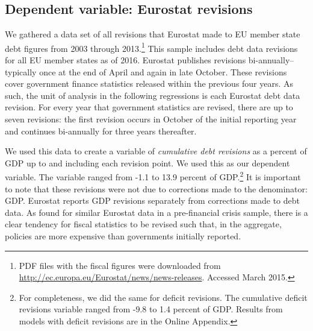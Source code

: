 \documentclass[]{article}
\begin{document}
\subsection{Dependent variable: Eurostat revisions}

We gathered a data set of all revisions that Eurostat made to EU member state debt figures from 2003 through 2013.\footnote{PDF files with the fiscal figures were downloaded from \url{http://ec.europa.eu/Eurostat/news/news-releases}. Accessed March 2015.} This sample includes debt data revisions for all EU member states as of 2016. Eurostat publishes revisions bi-annually--typically once at the end of April and again in late October. These revisions cover government finance statistics released within the previous four years. As such, the unit of analysis in the following regressions is each Eurostat debt data revision. For every year that government statistics are revised, there are up to seven revisions: the first revision occurs in October of the initial reporting year and continues bi-annually for three years thereafter.

We used this data to create a variable of \emph{cumulative debt revisions} as a percent of GDP up to and including each revision point. We used this as our dependent variable. The variable ranged from -1.1 to 13.9 percent of GDP.\footnote{For completeness, we did the same for deficit revisions. The cumulative deficit revisions variable ranged from -9.8 to 1.4 percent of GDP. Results from models with deficit revisions are in the Online Appendix.} It is important to note that these revisions were not due to corrections  made to the denominator: GDP. Eurostat reports GDP revisions separately from corrections made to debt data. As \cite{DeCastro2013} found for similar Eurostat data in a pre-financial crisis sample, there is a clear tendency for fiscal statistics to be revised such that, in the aggregate, policies are more expensive than governments initially reported.
\end{document}
